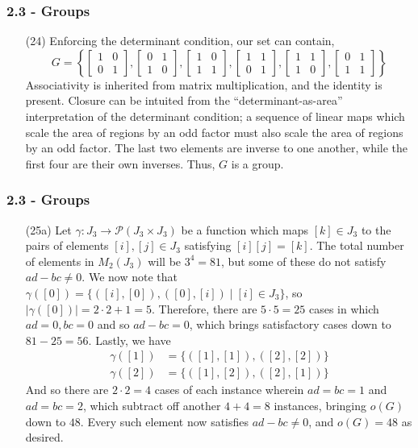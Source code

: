 \documentclass{beamer}
\begin{document}
\begin{frame}
\frametitle{2.3 - Groups}
\small
\begin{enumerate}
	\item[(24)] Enforcing the determinant condition, our set can contain,
	\begin{equation*}
	G = \left\{
	\begin{bmatrix}
		1 & 0 \\
		0 & 1
	\end{bmatrix}, 	
	\begin{bmatrix}
		0 & 1 \\
		1 & 0
	\end{bmatrix}, 
	\begin{bmatrix}
		1 & 0 \\
		1 & 1
	\end{bmatrix}, 	
	\begin{bmatrix}
		1 & 1 \\
		0 & 1
	\end{bmatrix}, 	
	\begin{bmatrix}
		1 & 1 \\
		1 & 0
	\end{bmatrix}, 
	\begin{bmatrix}
		0 & 1 \\
		1 & 1
	\end{bmatrix}
	\right\}
	\end{equation*}
	Associativity is inherited from matrix multiplication, and the identity is present. Closure can be intuited from the ``determinant-as-area'' interpretation of the determinant condition; a sequence of linear maps which scale the area of regions by an odd factor must also scale the area of regions by an odd factor. The last two elements are inverse to one another, while the first four are their own inverses. Thus, $G$ is a group.
\end{enumerate}
\end{frame}
\begin{frame}
\frametitle{2.3 - Groups}
\small
\begin{enumerate}
	\item[(25a)] Let $\gamma: J_3\to \mathcal{P}\left(J_3\times J_3\right)$ be a function which maps $[k]\in J_3$ to the pairs of elements $[i],[j]\in J_3$ satisfying $[i][j]=[k]$. The total number of elements in $M_2(J_3)$ will be $3^4 = 81$, but some of these do not satisfy $ad-bc\neq 0$. We now note that $\gamma([0]) = \{([i], [0]), ([0], [i]) \mid [i]\in J_3\}$, so $|\gamma([0])| = 2\cdot 2 + 1 = 5$. Therefore, there are $5\cdot 5 = 25$ cases in which $ad = 0, bc = 0$ and so $ad - bc = 0$, which brings satisfactory cases down to $81 - 25 = 56$. Lastly, we have
	\begin{align*}
	\gamma([1]) &= \{([1], [1]), ([2], [2])\} \\
	\gamma([2]) &= \{([1], [2]), ([2], [1])\}
	\end{align*}
	And so there are $2\cdot 2 = 4$ cases of each instance wherein $ad = bc = 1$ and $ad = bc = 2$, which subtract off another $4 + 4 = 8$ instances, bringing $o(G)$ down to $48$. Every such element now satisfies $ad - bc \neq 0$, and $o(G) = 48$ as desired.
\end{enumerate}
\end{frame}
\end{document}

